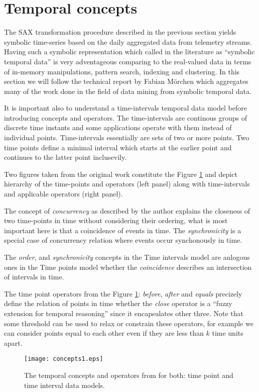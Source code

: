 \section{Temporal concepts} \label{tconcepts}
The SAX transformation procedure described in the previous section yields symbolic time-series based on the daily aggregated data from telemetry streams. Having such a symbolic representation which called in the literature as ``symbolic temporal data'' is very adventageous comparing to the real-valued data in terms of in-memory manipulations, pattern search, indexing and clustering. In this section we will follow the technical report by Fabian M\"orchen \cite{citeulike:1748833} which aggregates many of the work done in the field of data mining from symbolic temporal data.

It is important also to understand a time-intervals temporal data model before introducing concepts and operators. The time-intervals are continous groups of discrete time instants and some applications operate with them instead of individual points. Time-intervals essentially are sets of two or more points. Two time points define a minimal interval which starts at the earlier point and continues to the latter point inclusevily.

Two figures taken from the original work constitute the Figure \ref{fig:concepts1} and depict hierarchy of the time-points and operators (left panel) along with time-intervals and applicable operators (right panel).

The concept of \textit{concurrency} as described by the author explains the closeness of two time-points in time without considering their ordering, what is most important here is that a coincidence of events in time. The \textit{synchronicity} is a special case of concurrency relation where events occur synchonously in time.

The \textit{order}, and \textit{synchronicity} concepts in the Time intervals model are anlogous ones in the Time points model whether the \textit{coincidence} describes an intersection of intervals in time.

The time point operators from the Figure \ref{fig:concepts1}: \textit{before}, \textit{after} and \textit{equals} precizely define the relation of points in time whether the \textit{close} operator is a ``fuzzy extension for temporal reasoning'' since it encapsulates other three. Note that some threshold can be used to relax or constrain these operators, for example we can consider points equal to each other even if they are less than $k$ time units apart.


\begin{figure}[tbp]
   \centering
   \texttt{[image: concepts1.eps]}
   \caption{The temporal concepts and operators from \cite{citeulike:1748833} for both: time point and time interval data models.}
   \label{fig:concepts1}
\end{figure}